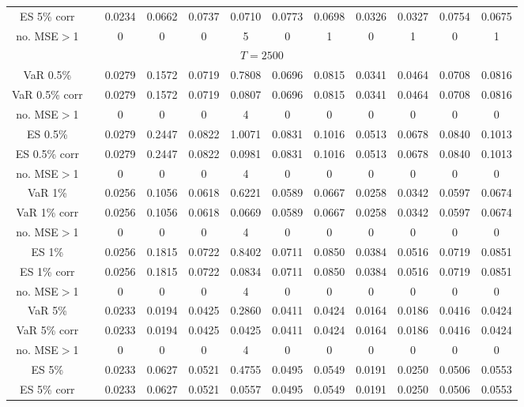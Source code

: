 {{\begin{sidewaystable}
\begin{tabular}{cc cc | cccc | cccc}
ES 5\% corr && 0.0234 & 0.0662 & 0.0737 & 0.0710 & 0.0773 & 0.0698 &0.0326 & 0.0327 & 0.0754 & 0.0675 \\ 
no. MSE$>$1 && 0 & 0 & 0 & 5 & 0 & 1 &0 & 1 & 0 & 1 \\[1ex] 
\hline 
\multicolumn{12}{c}{$T =2500$}  \\ 
\hline 
VaR 0.5\% && 0.0279 & 0.1572 & 0.0719 & 0.7808 & 0.0696 & 0.0815 &0.0341 & 0.0464 & 0.0708 & 0.0816 \\ 
VaR 0.5\% corr && 0.0279 & 0.1572 & 0.0719 & 0.0807 & 0.0696 & 0.0815 &0.0341 & 0.0464 & 0.0708 & 0.0816 \\ 
no. MSE$>$1 && 0 & 0 & 0 & 4 & 0 & 0 &0 & 0 & 0 & 0 \\[1ex] 
ES 0.5\% && 0.0279 & 0.2447 & 0.0822 & 1.0071 & 0.0831 & 0.1016 &0.0513 & 0.0678 & 0.0840 & 0.1013 \\ 
ES 0.5\% corr && 0.0279 & 0.2447 & 0.0822 & 0.0981 & 0.0831 & 0.1016 &0.0513 & 0.0678 & 0.0840 & 0.1013 \\ 
no. MSE$>$1 && 0 & 0 & 0 & 4 & 0 & 0 &0 & 0 & 0 & 0 \\[1.5ex]  
 \rowcolor{LightCyan} 
VaR 1\% && 0.0256 & 0.1056 & 0.0618 & 0.6221 & 0.0589 & 0.0667 &0.0258 & 0.0342 & 0.0597 & 0.0674 \\  
 \rowcolor{LightCyan} 
VaR 1\% corr && 0.0256 & 0.1056 & 0.0618 & 0.0669 & 0.0589 & 0.0667 &0.0258 & 0.0342 & 0.0597 & 0.0674 \\ 
 \rowcolor{LightCyan} 
no. MSE$>$1 && 0 & 0 & 0 & 4 & 0 & 0 &0 & 0 & 0 & 0 \\[1ex] 
 \rowcolor{LightCyan} 
ES 1\% && 0.0256 & 0.1815 & 0.0722 & 0.8402 & 0.0711 & 0.0850 &0.0384 & 0.0516 & 0.0719 & 0.0851 \\ 
 \rowcolor{LightCyan} 
ES 1\% corr && 0.0256 & 0.1815 & 0.0722 & 0.0834 & 0.0711 & 0.0850 &0.0384 & 0.0516 & 0.0719 & 0.0851 \\ 
 \rowcolor{LightCyan} 
no. MSE$>$1 && 0 & 0 & 0 & 4 & 0 & 0 &0 & 0 & 0 & 0 \\[1.5ex] 
VaR 5\% && 0.0233 & 0.0194 & 0.0425 & 0.2860 & 0.0411 & 0.0424 &0.0164 & 0.0186 & 0.0416 & 0.0424 \\ 
VaR 5\% corr && 0.0233 & 0.0194 & 0.0425 & 0.0425 & 0.0411 & 0.0424 &0.0164 & 0.0186 & 0.0416 & 0.0424 \\ 
no. MSE$>$1 && 0 & 0 & 0 & 4 & 0 & 0 &0 & 0 & 0 & 0 \\[1ex] 
ES 5\% && 0.0233 & 0.0627 & 0.0521 & 0.4755 & 0.0495 & 0.0549 &0.0191 & 0.0250 & 0.0506 & 0.0553 \\ 
ES 5\% corr && 0.0233 & 0.0627 & 0.0521 & 0.0557 & 0.0495 & 0.0549 &0.0191 & 0.0250 & 0.0506 & 0.0553 \\ 

\end{tabular}
\end{sidewaystable}}}
